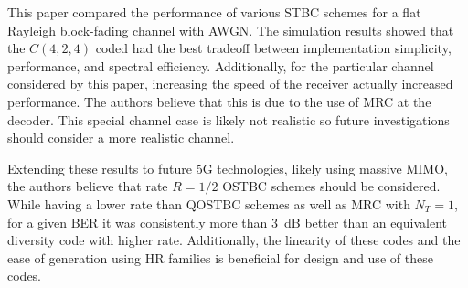 

This paper compared the performance of various STBC schemes for a flat Rayleigh block-fading channel with AWGN. The simulation results showed that the $C(4,2,4)$ coded had the best tradeoff between implementation simplicity, performance, and spectral efficiency. Additionally, for the particular channel considered by this paper, increasing the speed of the receiver actually increased performance. The authors believe that this is due to the use of MRC at the decoder. This special channel case is likely not realistic so future investigations should consider a more realistic channel.

Extending these results to future 5G technologies, likely using massive MIMO, the authors believe that rate $R=1/2$ OSTBC schemes should be considered. While having a lower rate than QOSTBC schemes as well as MRC with $N_T=1$, for a given BER it was consistently more than 3~dB better than an equivalent diversity code with higher rate. Additionally, the linearity of these codes and the ease of generation using HR families is beneficial for design and use of these codes.